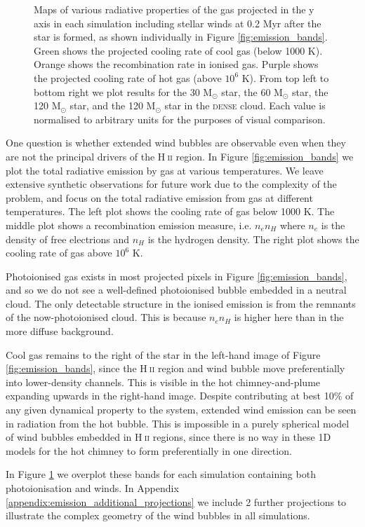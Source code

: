 \documentclass[a4paper,fleqn,usenatbib]{mnras}
\newcommand{\Msolar}{M$_{\odot}$\xspace}
\newcommand{\HII}{H$~$\textsc{ii}\xspace}
\begin{document}
\begin{figure}
	\caption{Maps of various radiative properties of the gas projected in the y axis in each simulation including stellar winds at 0.2 Myr after the star is formed, as shown individually in Figure \ref{fig:emission_bands}. Green shows the projected cooling rate of cool gas (below 1000 K). Orange shows the recombination rate in ionised gas. Purple shows the projected cooling rate of hot gas (above $10^6$ K). From top left to bottom right we plot results for the 30 \Msolar star, the 60 \Msolar star, the 120 \Msolar star, and the 120 \Msolar star in the \textsc{dense} cloud. Each value is normalised to arbitrary units for the purposes of visual comparison.}
	\label{fig:observability_yproj}
\end{figure}

One question is whether extended wind bubbles are observable even when they are not the principal drivers of the \HII region. In Figure \ref{fig:emission_bands} we plot the total radiative emission by gas at various temperatures. We leave extensive synthetic observations for future work due to the complexity of the problem, and focus on the total radiative emission from gas at different temperatures. The left plot shows the cooling rate of gas below 1000 K. The middle plot shows a recombination emission measure, i.e. $n_e n_H$ where $n_e$ is the density of free electrions and $n_H$ is the hydrogen density. The right plot shows the cooling rate of gas above $10^6$ K.

Photoionised gas exists in most projected pixels in Figure \ref{fig:emission_bands}, and so we do not see a well-defined photoionised bubble embedded in a neutral cloud. The only detectable structure in the ionised emission is from the remnants of the now-photoionised cloud. This is because $n_e n_H$ is higher here than in the more diffuse background.

Cool gas remains to the right of the star in the left-hand image of Figure \ref{fig:emission_bands}, since the \HII region and wind bubble move preferentially into lower-density channels. This is visible in the hot chimney-and-plume expanding upwards in the right-hand image. Despite contributing at best 10\% of any given dynamical property to the system, extended wind emission can be seen in radiation from the hot bubble. This is impossible in a purely spherical model of wind bubbles embedded in \HII regions, since there is no way in these 1D models for the hot chimney to form preferentially in one direction.

In Figure \ref{fig:observability_yproj} we overplot these bands for each simulation containing both photoionisation and winds. In Appendix \ref{appendix:emission_additional_projections} we include 2 further projections to illustrate the complex geometry of the wind bubbles in all simulations.
\end{document}
